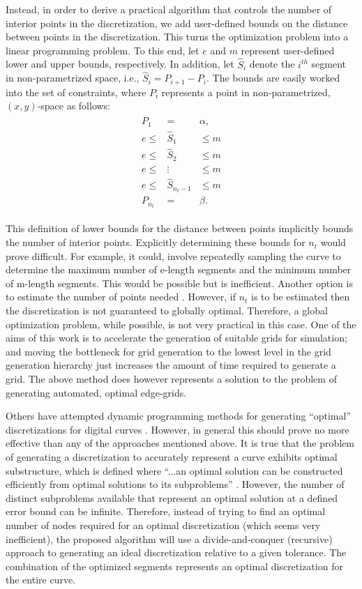 Instead, in order to derive a practical algorithm that controls the 
number of interior points in the discretization, we add user-defined 
bounds on the distance between points in the discretization.  This turns 
the optimization problem into a linear programming problem.  To this end, 
let $e$ and $m$ represent user-defined lower and upper bounds, 
respectively.  In addition, let $\hat{S}_i$ denote the $i^{th}$ segment 
in non-parametrized space, i.e., $\hat{S}_i = P_{i+1}-P_i$.  The bounds 
are easily worked into the set of constraints, where $P_i$ represents a 
point in non-parametrized, $(x,y)$-space as follows: 
\begin{eqnarray*} 
\begin{array}{rcl} 
P_1 & = & \alpha,\\ 
e \leq & \hat{S}_1 & \leq m \\ 
e \leq & \hat{S}_2 & \leq m \\ 
e \leq & \vdots & \leq m \\ 
e \leq & \hat{S}_{n_t-1} & \leq m \\ 
P_{n_t} & = & \beta. 
\end{array} 
\end{eqnarray*}

This definition of lower bounds for the distance between points 
implicitly bounds the number of interior points.  Explicitly determining 
these bounds for $n_t$ would prove difficult. For example, it 
could, involve repeatedly sampling the curve to 
determine the maximum number of e-length segments and the minimum number 
of m-length segments. This would be possible but is inefficient. Another 
option is to estimate the number of points needed \cite{cuilliere97}. 
However, if $n_t$ is to be estimated then the discretization is not 
guaranteed to globally optimal. Therefore, a global optimization problem, 
while possible, is not very practical in this case. One of the aims of 
this work is to accelerate the generation of suitable grids for 
simulation; and moving the bottleneck for grid generation to the lowest 
level in the grid generation hierarchy just increases the amount of time 
required to generate a grid. The above method does however represents a 
solution to the problem of generating automated, optimal edge-grids.

Others have attempted dynamic programming methods for generating 
``optimal'' discretizations for digital curves \cite{horng02}. However, in 
general this should prove no more effective than any of the approaches 
mentioned above. It is true that the problem of generating a discretization to accurately represent a curve exhibits optimal substructure, 
which is defined where ``...an optimal solution can be constructed 
efficiently from optimal solutions to its subproblems'' \cite{cormen01}. 
However, the number of distinct subproblems available that represent an optimal solution at a defined error bound can be infinite. Therefore, instead of trying to find an optimal number of nodes required for an optimal discretization (which seems very inefficient), the proposed algorithm will use a divide-and-conquer (recursive) approach to generating an ideal discretization relative to a given tolerance. The combination of the optimized segments represents an optimal discretization for the entire curve.

